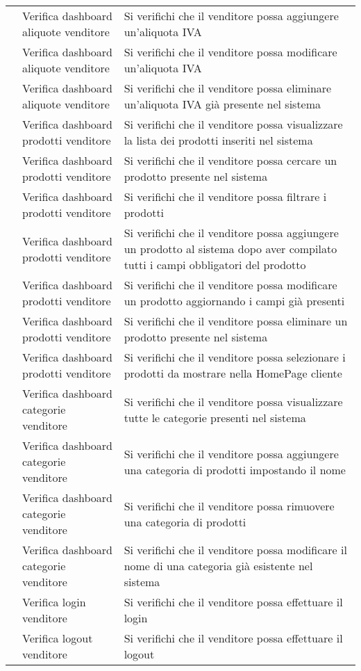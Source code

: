 \begin{center}
\begin{longtable}{p{1cm}|p{6.85cm}|p{7cm}|}
	 & Verifica dashboard aliquote venditore & Si verifichi che il venditore possa aggiungere un'aliquota IVA \\
	 & Verifica dashboard aliquote venditore & Si verifichi che il venditore possa modificare un'aliquota IVA \\
	 & Verifica dashboard aliquote venditore & Si verifichi che il venditore possa eliminare un'aliquota IVA già presente nel sistema \\
	 & Verifica dashboard prodotti venditore & Si verifichi che il venditore possa visualizzare la lista dei prodotti inseriti nel sistema \\
	& Verifica dashboard prodotti venditore & Si verifichi che il venditore possa cercare un prodotto presente nel sistema \\
	 & Verifica dashboard prodotti venditore & Si verifichi che il venditore possa filtrare i prodotti \\
	 & Verifica dashboard prodotti venditore & Si verifichi che il venditore possa aggiungere un prodotto al sistema dopo aver compilato tutti i campi obbligatori del prodotto \\
	 & Verifica dashboard prodotti venditore & Si verifichi che il venditore possa modificare un prodotto aggiornando i campi già presenti\\
	 & Verifica dashboard prodotti venditore & Si verifichi che il venditore possa eliminare un prodotto presente nel sistema\\
	 & Verifica dashboard prodotti venditore & Si verifichi che il venditore possa selezionare i prodotti da mostrare nella HomePage cliente \\
	 & Verifica dashboard categorie venditore & Si verifichi che il venditore possa visualizzare tutte le categorie presenti nel sistema \\
	 & Verifica dashboard categorie venditore & Si verifichi che il venditore possa aggiungere una categoria di prodotti impostando il nome \\
	 & Verifica dashboard categorie venditore & Si verifichi che il venditore possa rimuovere una categoria di prodotti \\
	 & Verifica dashboard categorie venditore & Si verifichi che il venditore possa modificare il nome di una categoria già esistente nel sistema \\
	 & Verifica login venditore & Si verifichi che il venditore possa effettuare il login \\
	 & Verifica logout venditore & Si verifichi che il venditore possa effettuare il logout \\
	\hline

	\end{longtable}
\end{center}


